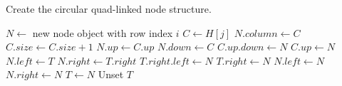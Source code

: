 \begin{algorithm}[htbp]
	\caption{Create the circular quad-linked node structure.}
	\label{alg:nodes}
	\begin{distribalgo}[1]
				\STATE $N \leftarrow$ new node object with row index $i$
				\STATE $C \leftarrow H[j]$
				\STATE $N.column \leftarrow C$
				\STATE $C.size \leftarrow C.size + 1$  
				\STATE $N.up \leftarrow C.up$  
				\STATE $N.down \leftarrow C$
				\STATE $C.up.down \leftarrow N$
				\STATE $C.up \leftarrow N$
					\STATE $N.left \leftarrow T$  
					\STATE $N.right \leftarrow T.right$
					\STATE $T.right.left \leftarrow N$
					\STATE $T.right \leftarrow N$
				\ELSE
					\STATE $N.left \leftarrow N$  
					\STATE $N.right \leftarrow N$
				\ENDIF
				\STATE $T \leftarrow N$
			\ENDFOR
			\STATE Unset $T$
		\ENDFOR
	\end{distribalgo}
\end{algorithm}


